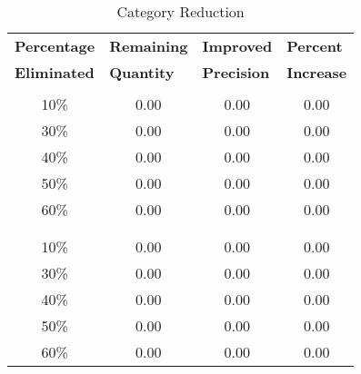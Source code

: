 \begin{table}[H]
    \centering
    \caption{Category Reduction}
    \begin{tabular}{m{2cm} m{2cm} m{1.9cm} m{2.4cm}}
        \toprule
        \rowcolor{White}\textbf{Percentage} & {\textbf{Remaining}} & {\textbf{Improved}} & {\textbf{Percent}}  \\
        \rowcolor{White}\textbf{Eliminated} & {\textbf{Quantity}} & {\textbf{Precision}} & {\textbf{Increase}}  \\
                \midrule

        \rowcolor{White}\multicolumn{4}{c}{\textbf{Support}} \\
        \cmidrule(lr){1-4}
        \multicolumn{1}{c}{10\%} & \multicolumn{1}{c}{0.00} & \multicolumn{1}{c}{0.00} & \multicolumn{1}{c}{0.00} \\
        \multicolumn{1}{c}{30\%} & \multicolumn{1}{c}{0.00} & \multicolumn{1}{c}{0.00} & \multicolumn{1}{c}{0.00} \\
        \multicolumn{1}{c}{40\%} & \multicolumn{1}{c}{0.00} & \multicolumn{1}{c}{0.00} & \multicolumn{1}{c}{0.00} \\
        \multicolumn{1}{c}{50\%} & \multicolumn{1}{c}{0.00} & \multicolumn{1}{c}{0.00} & \multicolumn{1}{c}{0.00} \\
        \multicolumn{1}{c}{60\%} & \multicolumn{1}{c}{0.00} & \multicolumn{1}{c}{0.00} & \multicolumn{1}{c}{0.00} \\

        \multicolumn{1}{c}{} & \multicolumn{1}{c}{} & \multicolumn{1}{c}{} & \multicolumn{1}{c}{} \\
        \rowcolor{White}\multicolumn{4}{c}{\textbf{Relevant}} \\
        \cmidrule(lr){1-4}
        \multicolumn{1}{c}{10\%} & \multicolumn{1}{c}{0.00} & \multicolumn{1}{c}{0.00} & \multicolumn{1}{c}{0.00} \\
        \multicolumn{1}{c}{30\%} & \multicolumn{1}{c}{0.00} & \multicolumn{1}{c}{0.00} & \multicolumn{1}{c}{0.00} \\
        \multicolumn{1}{c}{40\%} & \multicolumn{1}{c}{0.00} & \multicolumn{1}{c}{0.00} & \multicolumn{1}{c}{0.00} \\
        \multicolumn{1}{c}{50\%} & \multicolumn{1}{c}{0.00} & \multicolumn{1}{c}{0.00} & \multicolumn{1}{c}{0.00} \\
        \multicolumn{1}{c}{60\%} & \multicolumn{1}{c}{0.00} & \multicolumn{1}{c}{0.00} & \multicolumn{1}{c}{0.00} \\


\end{tabular}
\end{table}
